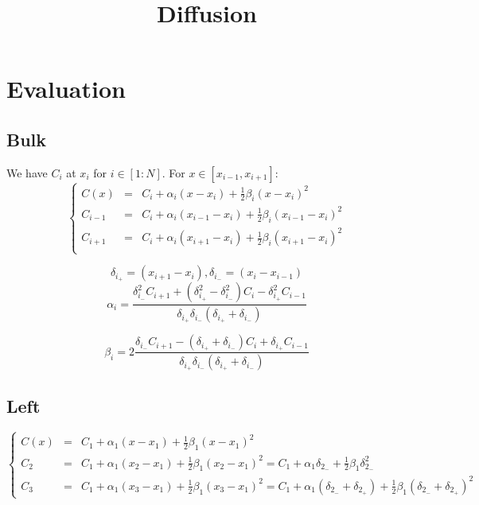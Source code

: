 \documentclass[aps,11pt]{revtex4}
\begin{document}
\title{Diffusion}
\maketitle

\section{Evaluation}

\subsection{Bulk}
We have $C_{i}$ at $x_i$ for $i\in[1:N]$.
For $x\in[x_{i-1},x_{i+1}]$:
\begin{equation}
\left\lbrace
\begin{array}{rcl}
	C(x)    & = & C_i + \alpha_i (x-x_i) + \frac{1}{2}\beta_i (x-x_i)^2\\
	C_{i-1} & = & C_i + \alpha_i (x_{i-1}-x_{i} ) + \frac{1}{2}\beta_i (x_{i-1}-x_i)^2\\
    C_{i+1} & = & C_i + \alpha_i (x_{i+1}-x_{i} ) + \frac{1}{2}\beta_i (x_{i+1}-x_i)^2\\
\end{array}
\right.
\end{equation}

$$
	\delta_{i_+} = (x_{i+1}-x_{i} ), \delta_{i_-} = (x_{i}-x_{i-1} ) 
$$
\begin{equation}
	\alpha_i = \dfrac{ \delta_{i_-}^2 C_{i+1}  +(\delta_{i_+}^2-\delta_{i_-}^2)C_i - \delta_{i_+}^2 C_{i-1} }{ \delta_{i_+}\delta_{i_-}(\delta_{i_+}+\delta_{i_-})  }
\end{equation}

\begin{equation}
\label{eq:beta_i}
	\beta_i = 2\dfrac{ \delta_{i_-} C_{i+1}  - (\delta_{i_+}+\delta_{i_-})C_i + \delta_{i_+} C_{i-1} }{ \delta_{i_+}\delta_{i_-}(\delta_{i_+}+\delta_{i_-})  }
\end{equation}

\subsection{Left}
\begin{equation}
\left\lbrace
\begin{array}{rcl}
	C(x)   & = & C_1 + \alpha_1 (x-x_1) + \frac{1}{2}\beta_1 (x-x_1)^2\\
	C_2    & = & C_1 + \alpha_1 (x_2-x_1) + \frac{1}{2}\beta_1 (x_2-x_1)^2 = C_1 + \alpha_1 \delta_{2_-} + \frac{1}{2}\beta_1 \delta_{2_-}^2 \\
	C_3    & = & C_1 + \alpha_1 (x_3-x_1) + \frac{1}{2}\beta_1 (x_3-x_1)^2 = C_1 + \alpha_1 (\delta_{2_-}+ \delta_{2_+} )+ \frac{1}{2}\beta_1 (\delta_{2_-}+ \delta_{2_+} )^2
\end{array}
\right.
\end{equation}
\end{document}

